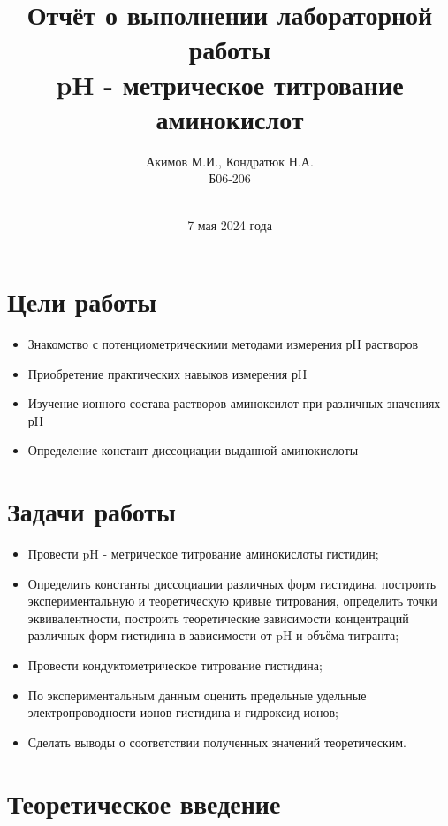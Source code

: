 \documentclass[a4paper, 11pt]{article}%
\author{Акимов М.И., Кондратюк Н.А. \\ Б06-206}
\title{Отчёт о выполнении лабораторной работы  \\ \textbf{pH - метрическое титрование аминокислот}}
\date{\\7 мая 2024 года}
\begin{document}
 \maketitle

       \section{Цели работы}
        \begin{itemize}
            \item Знакомство с потенциометрическими методами измерения рН растворов
            \item Приобретение практических навыков измерения рН
            \item Изучение ионного состава растворов аминоксилот при различных значениях рН
            \item Определение констант диссоциации выданной аминокислоты
        \end{itemize}

        \section{Задачи работы}
        \begin{itemize}
             \item Провести pH - метрическое титрование аминокислоты гистидин; 
             \item Определить константы диссоциации различных форм гистидина, построить экспериментальную и теоретическую кривые титрования, определить точки эквивалентности, построить теоретические зависимости концентраций различных форм гистидина в зависимости от pH и объёма титранта;
             \item Провести кондуктометрическое титрование гистидина;
             \item По экспериментальным данным оценить предельные удельные электропроводности ионов гистидина и гидроксид-ионов;
             \item Сделать выводы о соответствии полученных значений теоретическим.
        \end{itemize}
        \newpage
\section{Теоретическое введение}
\end{document}
